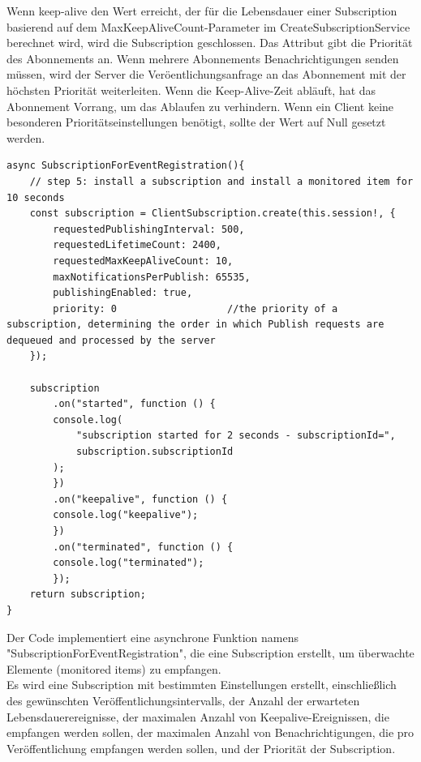 Wenn \dq keep-alive \dq den Wert erreicht, der für die Lebensdauer einer Subscription basierend auf dem MaxKeepAliveCount-Parameter im CreateSubscriptionService berechnet wird, wird die Subscription geschlossen.
Das Attribut gibt die Priorität des Abonnements an. Wenn mehrere
Abonnements Benachrichtigungen senden müssen, wird der Server die Veröentlichungsanfrage an das Abonnement mit der höchsten Priorität weiterleiten. Wenn die Keep-Alive-Zeit abläuft, hat das Abonnement Vorrang, um
das Ablaufen zu verhindern. Wenn ein Client keine besonderen Prioritätseinstellungen benötigt, sollte der Wert auf Null gesetzt werden.\\

\begin{lstlisting}[style=JavaScript, caption={SubscriptionForEventRegistration}]
async SubscriptionForEventRegistration(){
    // step 5: install a subscription and install a monitored item for 10 seconds
    const subscription = ClientSubscription.create(this.session!, {
        requestedPublishingInterval: 500,
        requestedLifetimeCount: 2400,
        requestedMaxKeepAliveCount: 10,
        maxNotificationsPerPublish: 65535,
        publishingEnabled: true,
        priority: 0                   //the priority of a subscription, determining the order in which Publish requests are dequeued and processed by the server
    });

    subscription
        .on("started", function () {
        console.log(
            "subscription started for 2 seconds - subscriptionId=",
            subscription.subscriptionId
        );
        })
        .on("keepalive", function () {
        console.log("keepalive");
        })
        .on("terminated", function () {
        console.log("terminated");
        });
    return subscription;
}
\end{lstlisting}

Der Code implementiert eine asynchrone Funktion namens "SubscriptionForEventRegistration", die eine Subscription erstellt, um überwachte Elemente (monitored items) zu empfangen.\\

Es wird eine Subscription mit bestimmten Einstellungen erstellt, einschließlich des gewünschten Veröffentlichungsintervalls, der Anzahl der erwarteten Lebensdauerereignisse, der maximalen Anzahl von Keepalive-Ereignissen, die empfangen werden sollen, der maximalen Anzahl von Benachrichtigungen, die pro Veröffentlichung empfangen werden sollen, und der Priorität der Subscription.\\

